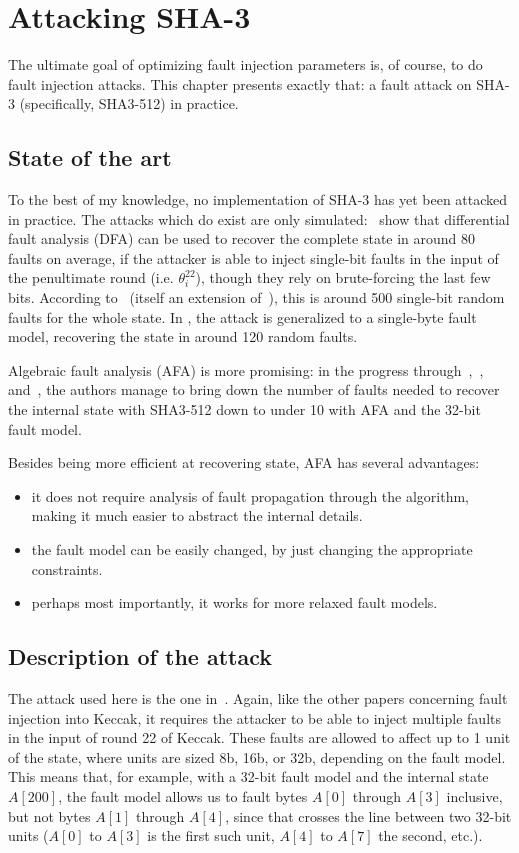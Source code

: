 \documentclass[times, utf8, diplomski]{fer}
\begin{document}
\chapter{Attacking SHA-3}\label{ch:attacking_keccak}
The ultimate goal of optimizing fault injection parameters is, of course, to
do fault injection attacks. This chapter presents exactly that: a fault attack
on SHA-3 (specifically, SHA3-512) in practice.

\section{State of the art}
To the best of my knowledge, no implementation of SHA-3 has yet been attacked in
practice. The attacks which do exist are only simulated:~\cite{DFA_SHA-3_single-bit}
show that differential fault analysis (DFA) can be used to recover the complete
state in around 80 faults on average, if the attacker is able to inject single-bit
faults in the input of the penultimate round (i.e. $\theta^{22}_i$), though they
rely on brute-forcing the last few bits. According to~\cite{luo2017relaxed}
(itself an extension of~\cite{luo2016shortSHA3}), this is around 500 single-bit
random faults for the whole state. In \cite{luo2017relaxed}, the attack is
generalized to a single-byte fault model, recovering the state in around 120
random faults.

Algebraic fault analysis (AFA) is more promising: in the progress
through~\cite{luo2016shortSHA3},~\cite{luo2017relaxed}, and~\cite{luo2018algebraic},
the authors manage to bring down the number of faults needed to recover the
internal state with SHA3-512 down to under 10 with AFA and the 32-bit fault
model.

Besides being more efficient at recovering state, AFA has several advantages:
\begin{itemize}
 \item it does not require analysis of fault propagation through the algorithm,
       making it much easier to abstract the internal details.
 \item the fault model can be easily changed, by just changing the appropriate constraints.
 \item perhaps most importantly, it works for more relaxed fault models.
\end{itemize}


\section{Description of the attack}
The attack used here is the one in~\cite{luo2018algebraic}.
Again, like the other papers concerning fault injection into Keccak, it requires
the attacker to be able to inject multiple faults in the input of round 22 of Keccak.
These faults are allowed to affect up to 1 unit of the state, where units are sized
8b, 16b, or 32b, depending on the fault model. This means that, for example, with
a 32-bit fault model and the internal state $A[200]$, the fault model allows us
to fault bytes $A[0]$ through $A[3]$ inclusive, but not bytes $A[1]$ through $A[4]$,
since that crosses the line between two 32-bit units ($A[0]$ to $A[3]$ is the first
such unit, $A[4]$ to $A[7]$ the second, etc.).
\end{document}
